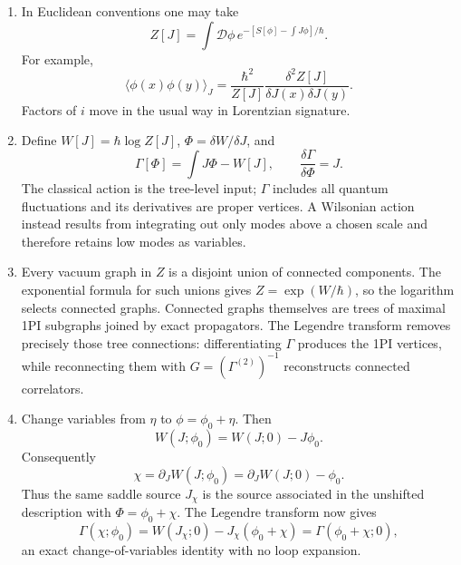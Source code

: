 \begin{enumerate}
  \begin{enumerate}
    \item[(a)] In Euclidean conventions one may take
      \[
        Z[J]=\int\mathcal D\phi\,
        e^{-[S[\phi]-\int J\phi]/\hbar}.
      \]
      For example,
      \[
        \langle\phi(x)\phi(y)\rangle_J
        =\frac{\hbar^2}{Z[J]}
          \frac{\delta^2Z[J]}{\delta J(x)\delta J(y)} .
      \]
      Factors of \(i\) move in the usual way in Lorentzian signature.
    \item[(b)] Define
      \(W[J]=\hbar\log Z[J]\),
      \(\Phi=\delta W/\delta J\), and
      \[
        \Gamma[\Phi]=\int J\Phi-W[J],\qquad
        \frac{\delta\Gamma}{\delta\Phi}=J .
      \]
      The classical action is the tree-level input; \(\Gamma\) includes
      all quantum fluctuations and its derivatives are proper vertices.
      A Wilsonian action instead results from integrating out only modes
      above a chosen scale and therefore retains low modes as variables.
    \item[(c)] Every vacuum graph in \(Z\) is a disjoint union of connected
      components.  The exponential formula for such unions gives
      \(Z=\exp(W/\hbar)\), so the logarithm selects connected graphs.
      Connected graphs themselves are trees of maximal 1PI subgraphs joined
      by exact propagators.  The Legendre transform removes precisely those
      tree connections: differentiating \(\Gamma\) produces the 1PI
      vertices, while reconnecting them with
      \(G=(\Gamma^{(2)})^{-1}\) reconstructs connected correlators.
    \item[(d)] Change variables from \(\eta\) to
      \(\phi=\phi_0+\eta\).  Then
      \[
        W(J;\phi_0)=W(J;0)-J\phi_0 .
      \]
      Consequently
      \[
        \chi=\partial_JW(J;\phi_0)
          =\partial_JW(J;0)-\phi_0 .
      \]
      Thus the same saddle source \(J_\chi\) is the source associated in
      the unshifted description with \(\Phi=\phi_0+\chi\).  The Legendre
      transform now gives
      \[
        \Gamma(\chi;\phi_0)
        =W(J_\chi;0)-J_\chi(\phi_0+\chi)
        =\Gamma(\phi_0+\chi;0),
      \]
      an exact change-of-variables identity with no loop expansion.
  \end{enumerate}

\end{enumerate}
